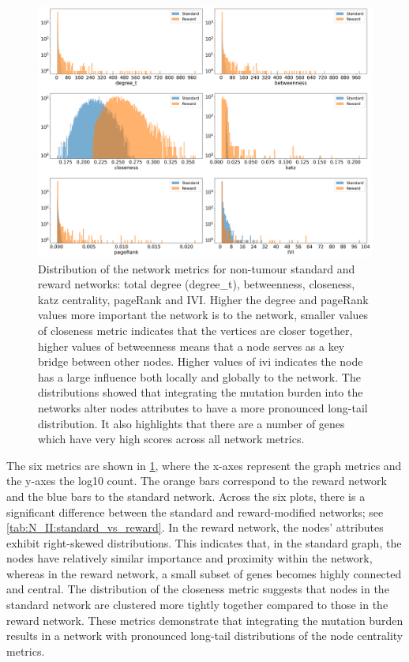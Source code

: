 \begin{figure}[!b]    
    \centering
    \includegraphics[width=1.0\textwidth,height=1.0\textheight,keepaspectratio]{Sections/Network_II/validation/net_metrics_Standard_Reward.png}
    \caption[Network metrics for healthy graphs]{Distribution of the network metrics for non-tumour standard and reward networks: total degree (degree\_t), betweenness, closeness, katz centrality, pageRank and IVI.  Higher the degree and pageRank values more important the network is to the network, smaller values of closeness metric indicates that the vertices are closer together, higher values of betweenness means that a node serves as a key bridge between other nodes. Higher values of \acrlong{ivi} indicates the node has a large influence both locally and globally to the network. The distributions showed that integrating the mutation burden into the networks alter nodes attributes to have a more pronounced long-tail distribution. It also highlights that there are a number of genes which have very high scores across  all network metrics.}
    \label{fig:N_II:net_metric_sig_std}
\end{figure}

The six metrics are shown in \cref{fig:N_II:net_metric_sig_std}, where the x-axes represent the graph metrics and the y-axes the log10 count. The orange bars correspond to the reward network and the blue bars to the standard network. Across the six plots, there is a significant difference between the standard and reward-modified networks; see \cref{tab:N_II:standard_vs_reward}. In the reward network, the nodes' attributes exhibit right-skewed distributions. This indicates that, in the standard graph, the nodes have relatively similar importance and proximity within the network, whereas in the reward network, a small subset of genes becomes highly connected and central. The distribution of the closeness metric suggests that nodes in the standard network are clustered more tightly together compared to those in the reward network. These metrics demonstrate that integrating the mutation burden results in a network with pronounced long-tail distributions of the node centrality metrics.

